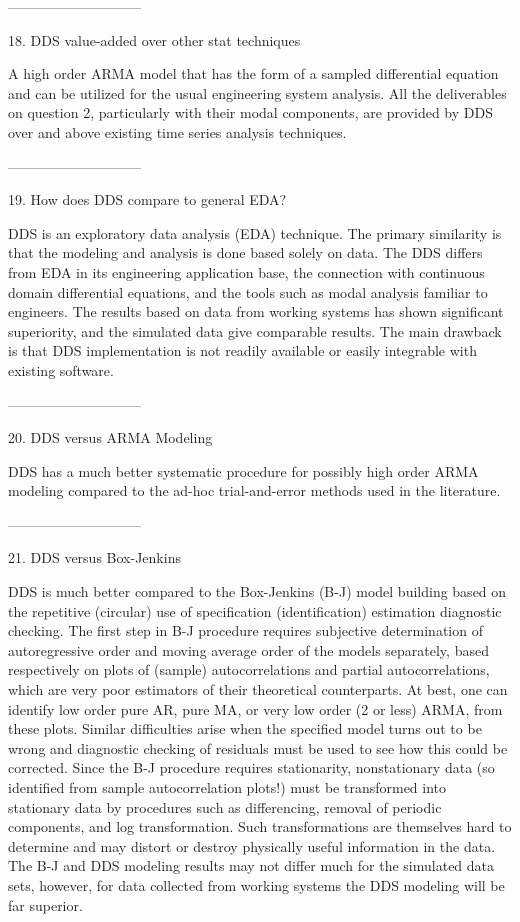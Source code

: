 -----------------------------
 
18. DDS value-added over other stat techniques
 
A high order ARMA model that has the form of a
sampled differential equation and can be utilized
for the usual engineering system analysis.  All
the deliverables on question 2, particularly with
their modal components, are provided by DDS over
and above existing time series analysis
techniques.
 
-----------------------------
 
19. How does DDS compare to general EDA?
 
DDS is an exploratory data analysis (EDA)
technique.  The primary similarity is that the
modeling and analysis is done based solely on
data.  The DDS differs from EDA in its engineering
application base, the connection with continuous
domain differential equations, and the tools such
as modal analysis familiar to engineers.  The
results based on data from working systems has
shown significant superiority, and the simulated
data give comparable results.  The main drawback
is that DDS implementation is not readily
available or easily integrable with existing
software.
 
-----------------------------
 
20. DDS versus ARMA Modeling
 
DDS has a much better systematic procedure for
possibly high order ARMA modeling compared to the
ad-hoc trial-and-error methods used in the
literature.
 
-----------------------------
 
21. DDS versus Box-Jenkins
 
DDS is much better compared to the Box-Jenkins
(B-J) model building based on the repetitive
(circular) use of specification (identification)
estimation diagnostic checking.  The first step in
B-J procedure requires subjective determination of
autoregressive order and moving average order of
the models separately, based respectively on plots
of (sample) autocorrelations and partial
autocorrelations, which are very poor estimators
of their theoretical counterparts.  At best, one
can identify low order pure AR, pure MA, or very
low order (2 or less) ARMA, from these plots.
Similar difficulties arise when the specified
model turns out to be wrong and diagnostic
checking of residuals must be used to see how this
could be corrected.  Since the B-J procedure
requires stationarity, nonstationary data (so
identified from sample autocorrelation plots!)
must be transformed into stationary data by
procedures such as differencing, removal of
periodic components, and log transformation.  Such
transformations are themselves hard to determine
and may distort or destroy physically useful
information in the data.  The B-J and DDS modeling
results may not differ much for the simulated data
sets, however, for data collected from working
systems the DDS modeling will be far superior.
 
